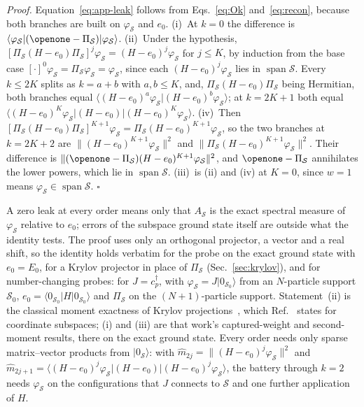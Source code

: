 \documentclass[aps,prb,reprint,onecolumn,12pt,superscriptaddress,longbibliography,floatfix]{revtex4-2}
\begin{document}
\noindent\emph{Proof.} Equation~\eqref{eq:app-leak} follows from Eqs.~\eqref{eq:Ok} and~\eqref{eq:recon}, because both branches are built on $\varphi_\mathcal S$ and $e_0$. (i)~At $k=0$ the difference is $\langle\varphi_\mathcal S|(\openone-\Pi_\mathcal S)|\varphi_\mathcal S\rangle$. (ii)~Under the hypothesis, $[\Pi_\mathcal S(H-e_0)\Pi_\mathcal S]^j\varphi_\mathcal S=(H-e_0)^j\varphi_\mathcal S$ for $j\le K$, by induction from the base case $[\cdot]^0\varphi_\mathcal S=\Pi_\mathcal S\varphi_\mathcal S=\varphi_\mathcal S$, since each $(H-e_0)^j\varphi_\mathcal S$ lies in $\operatorname{span}\mathcal S$. Every $k\le2K$ splits as $k=a+b$ with $a,b\le K$, and, $\Pi_\mathcal S(H-e_0)\Pi_\mathcal S$ being Hermitian, both branches equal $\langle(H-e_0)^a\varphi_\mathcal S|(H-e_0)^b\varphi_\mathcal S\rangle$; at $k=2K+1$ both equal $\langle(H-e_0)^K\varphi_\mathcal S|(H-e_0)|(H-e_0)^K\varphi_\mathcal S\rangle$. (iv)~Then $[\Pi_\mathcal S(H-e_0)\Pi_\mathcal S]^{K+1}\varphi_\mathcal S=\Pi_\mathcal S(H-e_0)^{K+1}\varphi_\mathcal S$, so the two branches at $k=2K+2$ are $\|(H-e_0)^{K+1}\varphi_\mathcal S\|^2$ and $\|\Pi_\mathcal S(H-e_0)^{K+1}\varphi_\mathcal S\|^2$. Their difference is $\|(\openone-\Pi_\mathcal S)(H-e_0)^{K+1}\varphi_\mathcal S\|^2$, and $\openone-\Pi_\mathcal S$ annihilates the lower powers, which lie in $\operatorname{span}\mathcal S$. (iii)~is (ii) and (iv) at $K=0$, since $w=1$ means $\varphi_\mathcal S\in\operatorname{span}\mathcal S$. $\square$

A zero leak at every order means only that $A_\mathcal S$ is the exact spectral measure of $\varphi_\mathcal S$ relative to $e_0$; errors of the subspace ground state itself are outside what the identity tests. The proof uses only an orthogonal projector, a vector and a real shift, so the identity holds verbatim for the probe on the exact ground state with $e_0=E_0$, for a Krylov projector in place of $\Pi_\mathcal S$ (Sec.~\ref{sec:krylov}), and for number-changing probes: for $J=c^\dagger_p$, with $\varphi_\mathcal S=J|0_{\mathcal S_0}\rangle$ from an $N$-particle support $\mathcal S_0$, $e_0=\langle0_{\mathcal S_0}|H|0_{\mathcal S_0}\rangle$ and $\Pi_\mathcal S$ on the $(N{+}1)$-particle support. Statement~(ii) is the classical moment exactness of Krylov projections~\cite{Lanczos1950,GM2010}, which Ref.~\cite{SQDspec2608} states for coordinate subspaces; (i) and (iii) are that work's captured-weight and second-moment results, there on the exact ground state. Every order needs only sparse matrix--vector products from $|0_\mathcal S\rangle$: with $\widehat m_{2j}=\|(H-e_0)^j\varphi_\mathcal S\|^2$ and $\widehat m_{2j+1}=\langle(H-e_0)^j\varphi_\mathcal S|(H-e_0)|(H-e_0)^j\varphi_\mathcal S\rangle$, the battery through $k=2$ needs $\varphi_\mathcal S$ on the configurations that $J$ connects to $\mathcal S$ and one further application of $H$.
\end{document}
